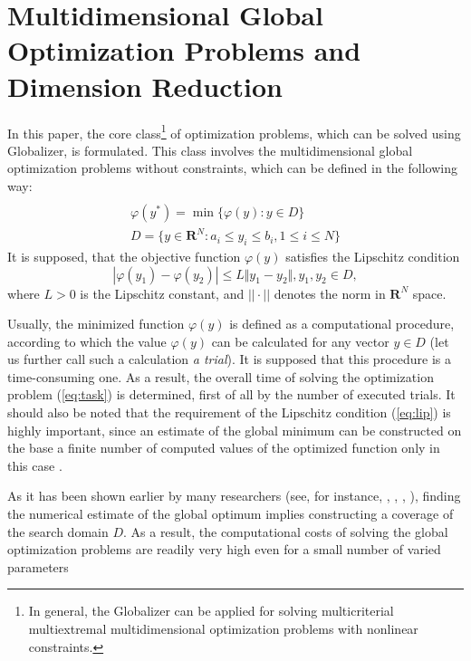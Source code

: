 \documentclass{aims}
\theoremstyle{definition}
\begin{document}
\section{Multidimensional Global Optimization Problems and Dimension Reduction}
\label{sec:problem}
In this paper, the core class\footnote{In general, the Globalizer can be applied for solving
multicriterial multiextremal multidimensional optimization problems with nonlinear constraints.}
of optimization problems, which can be solved using
Globalizer, is formulated. This class involves the multidimensional global
optimization problems without constraints, which can be defined in the following way:
\begin{equation}
\label{eq:task}
\begin{array}{cr}\\
  \varphi(y^*)=\min\{\varphi(y):y\in D\} \\
  D=\{y\in \mathbf{R}^N:a_i\leq y_i\leq{b_i}, 1\leq{i}\leq{N}\}
\end{array}
\end{equation}
It is supposed, that the objective function \(\varphi(y)\) satisfies the Lipschitz condition
\begin{equation}
\label{eq:lip}
|\varphi(y_1)-\varphi(y_2)|\leq L\Vert y_1-y_2\Vert,y_1,y_2\in D,
\end{equation}
where \(L>0\) is the Lipschitz constant, and \(||\cdot||\) denotes the norm in \(\mathbf{R}^N\) space.
\par
Usually, the minimized function \(\varphi(y)\) is defined as a computational procedure,
according to which the value \(\varphi(y)\) can be calculated for any vector \(y\in D\)
(let us further call such a calculation \textit{a trial}). It is supposed that this procedure
is a time-consuming one. As a result, the overall time of solving the optimization
problem (\ref{eq:task}) is determined, first of all by the number of executed trials.
It should also be noted that the requirement of the Lipschitz condition (\ref{eq:lip})
is highly important, since an estimate of the global minimum can be constructed on the
base a finite number of computed values of the optimized function only in this case .
\par
As it has been shown earlier by many researchers
(see, for instance, \cite{floudasPardalosGOState}, \cite{horstTuyGO}, \cite{pinterGO}, \cite{strSergGO}),
finding the numerical estimate of the global optimum implies constructing a coverage of
the search domain \(D\). As a result, the computational costs of solving the global
optimization problems are readily very high even for a small number of varied parameters
\end{document}
